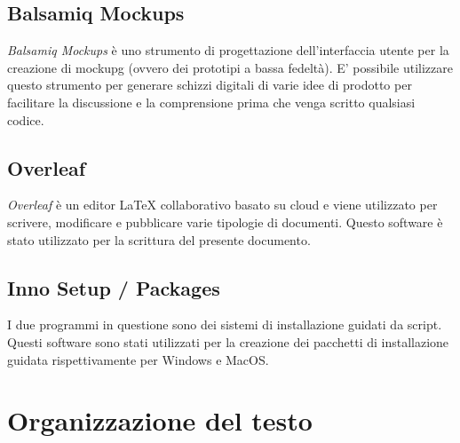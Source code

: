 \subsection*{Balsamiq Mockups}
\textit{Balsamiq Mockups} è uno strumento di progettazione dell'interfaccia utente per la creazione di \gls{mockupg} (ovvero dei prototipi a bassa fedeltà). E' possibile utilizzare questo strumento per generare schizzi digitali di varie idee di prodotto per facilitare la discussione e la comprensione prima che venga scritto qualsiasi codice.

\subsection*{Overleaf}
\textit{Overleaf} è un editor LaTeX collaborativo basato su cloud e viene utilizzato per scrivere, modificare e pubblicare varie tipologie di documenti. Questo software è stato utilizzato per la scrittura del presente documento.

\subsection*{Inno Setup / Packages}
I due programmi in questione sono dei sistemi di installazione guidati da script. Questi software sono stati utilizzati per la creazione dei pacchetti di installazione guidata rispettivamente per Windows e MacOS.

\section{Organizzazione del testo}

